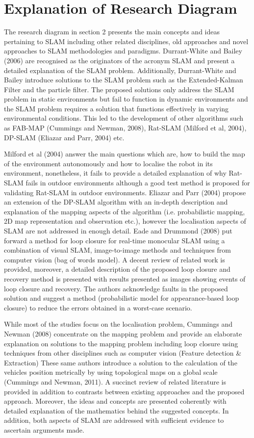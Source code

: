 \documentclass[a4paper, 12pt]{article}
\begin{document}
\newpage 
\section{ Explanation of Research Diagram }
The research diagram in section 2 presents the main concepts and ideas pertaining to SLAM including other related disciplines, old approaches and novel approaches to SLAM methodologies and paradigms. Durrant-White and Bailey (2006) are recognised as the originators of the acronym SLAM and present a detailed explanation of the SLAM problem. Additionally, Durrant-White and Bailey introduce solutions to the SLAM problem such as the Extended-Kalman Filter and the particle filter. The proposed solutions only address the SLAM problem in static environments but fail to function in dynamic environments and the SLAM problem requires a solution that functions effectively in varying environmental conditions. This led to the development of other algorithms such as FAB-MAP (Cummings and Newman, 2008), Rat-SLAM (Milford et al, 2004), DP-SLAM (Eliazar and Parr, 2004) etc.

Milford et al (2004) answer the main questions which are, how to build the map of the environment autonomously and how to localise the robot in its environment, nonetheless, it fails to provide a detailed explanation of why Rat-SLAM fails in outdoor environments although a good test method is proposed for validating Rat-SLAM in outdoor environments. Eliazar and Parr (2004) propose an extension of the DP-SLAM algorithm with an in-depth description and explanation of the mapping aspects of the algorithm (i.e. probabilistic mapping, 2D map representation and observation etc.), however the localisation aspects of SLAM are not addressed in enough detail. Eade and Drummond (2008) put forward a method for loop closure for real-time monocular SLAM using a combination of visual SLAM, image-to-image methods and techniques from computer vision (bag of words model). A decent review of related work is provided, moreover, a detailed description of the proposed loop closure and recovery method is presented with results presented as images showing events of loop closure and recovery. The authors acknowledge faults in the proposed solution and suggest a method (probabilistic model for appearance-based loop closure) to reduce the errors obtained in a worst-case scenario.
 
While most of the studies focus on the localisation problem, Cummings and Newman (2008) concentrate on the mapping problem and provide an elaborate explanation on solutions to the mapping problem including loop closure using techniques from other disciplines such as computer vision (Feature detection \& Extraction) These same authors introduce a solution to the calculation of the vehicles position metrically by using topological maps on a global scale (Cummings and Newman, 2011). A succinct review of related literature is provided in addition to contrasts between existing approaches and the proposed approach. Moreover, the ideas and concepts are presented coherently with detailed explanation of the mathematics behind the suggested concepts. In addition, both aspects of SLAM are addressed with sufficient evidence to ascertain arguments made.
 
\end{document}
